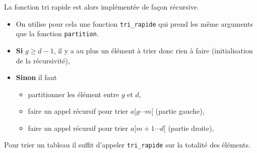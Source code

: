 %
%
%

La fonction tri rapide est alors implémentée de façon récursive.
\begin{itemize}
\item On utilise pour cela une fonction \texttt{tri\_rapide} qui prend les même arguments que la fonction \texttt{partition}.
\item \textbf{Si} \textbf{$g\geq d-1$}, il y a au plus un élément à trier donc rien à faire (initialisation de la récursivité),
\item \textbf{Sinon} il faut
\begin{itemize}
\item partitionner les élément entre \textbf{$g$} et \textbf{$d$},
\item faire un appel récursif pour trier $a[g\cdots m[$ (partie gauche),
\item faire un appel récursif pour trier $a[m+1\cdots d[$ (partie droite),
\end{itemize} 
\end{itemize} 



Pour trier un tableau il suffit d'appeler \texttt{tri\_rapide} sur la totalité des éléments.


%
%
%

